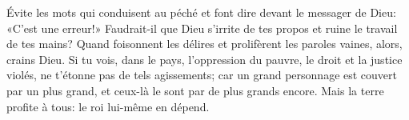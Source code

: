 Évite les mots qui conduisent au péché
	et font dire devant le messager de Dieu: «C’est une erreur!»
Faudrait-il que Dieu s’irrite de tes propos
	et ruine le travail de tes mains?
Quand foisonnent les délires et prolifèrent les paroles vaines,
	alors, crains Dieu.
Si tu vois, dans le pays, l’oppression du pauvre, le droit et la justice violés,
	ne t’étonne pas de tels agissements;
	car un grand personnage est couvert par un plus grand,
	et ceux-là le sont par de plus grands encore.
Mais la terre profite à tous: le roi lui-même en dépend.
